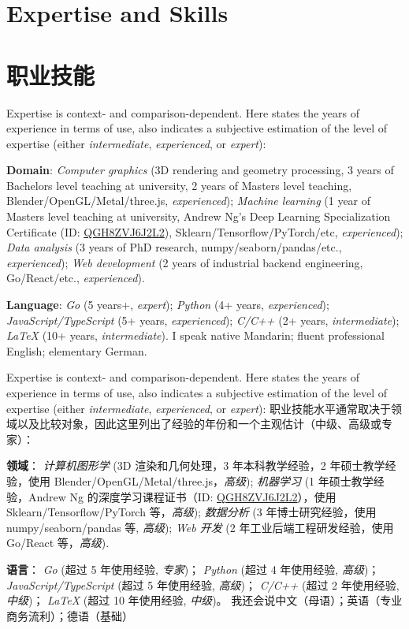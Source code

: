 {
  \section{\textbf{Expertise and Skills}}
}{
  \section{\textbf{职业技能}}
}
 {
  \small
  Expertise is context- and comparison-dependent. Here states the years of experience in terms of use, also indicates a subjective estimation of the level of expertise (either \emph{intermediate}, \emph{experienced}, or \emph{expert}):
  \resumeSubHeadingListStart
  \item{\textbf{Domain}:
  \emph{Computer graphics} (3D rendering and geometry processing, 3 years of Bachelors level teaching at university, 2 years of Masters level teaching, Blender/OpenGL/Metal/three.js, \emph{experienced});
  \emph{Machine learning} (1 year of Masters level teaching at university, Andrew Ng's Deep Learning Specialization Certificate (ID: \href{https://www.coursera.org/account/accomplishments/specialization/QGH8ZVJ6J2L2}{QGH8ZVJ6J2L2}), Sklearn/Tensorflow/PyTorch/etc, \emph{experienced});
  \emph{Data analysis} (3 years of PhD research, numpy/seaborn/pandas/etc., \emph{experienced});
  \emph{Web development} (2 years of industrial backend engineering, Go/React/etc., \emph{experienced}).
  }
  \item{\textbf{Language}:
  \emph{Go} (5 years+, \emph{expert});
  \emph{Python} (4+ years, \emph{experienced});
  \emph{JavaScript/TypeScript} (5+ years, \emph{experienced});
  \emph{C/C++} (2+ years, \emph{intermediate});
  \emph{\LaTeX} (10+ years, \emph{intermediate}).
  I speak native Mandarin; fluent professional English; elementary German.
  }
  \resumeSubHeadingListEnd
}{
  \small
  Expertise is context- and comparison-dependent. Here states the years of experience in terms of use, also indicates a subjective estimation of the level of expertise (either \emph{intermediate}, \emph{experienced}, or \emph{expert}):
  职业技能水平通常取决于领域以及比较对象，因此这里列出了经验的年份和一个主观估计（中级、高级或专家）：
  \resumeSubHeadingListStart
  \item{\textbf{领域}：
  \emph{计算机图形学} (3D 渲染和几何处理，3 年本科教学经验，2 年硕士教学经验，使用 Blender/OpenGL/Metal/three.js，\emph{高级});
  \emph{机器学习} (1 年硕士教学经验，Andrew Ng 的深度学习课程证书（ID: \href{https://www.coursera.org/account/accomplishments/specialization/QGH8ZVJ6J2L2}{QGH8ZVJ6J2L2}），使用 Sklearn/Tensorflow/PyTorch 等，\emph{高级});
  \emph{数据分析} (3 年博士研究经验，使用 numpy/seaborn/pandas 等, \emph{高级});
  \emph{Web 开发} (2 年工业后端工程研发经验，使用 Go/React 等，\emph{高级}).
  }
  \item{\textbf{语言}：
  \emph{Go} (超过 5 年使用经验, \emph{专家})；
  \emph{Python} (超过 4 年使用经验, \emph{高级})；
  \emph{JavaScript/TypeScript} (超过 5 年使用经验, \emph{高级})；
  \emph{C/C++} (超过 2 年使用经验, \emph{中级})；
  \emph{\LaTeX} (超过 10 年使用经验, \emph{中级})。
  我还会说中文（母语）；英语（专业商务流利）；德语（基础）
  }
  \resumeSubHeadingListEnd
}